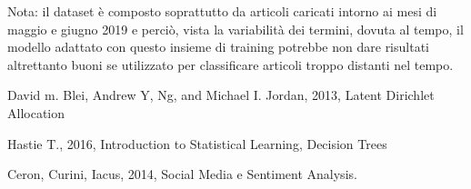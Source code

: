 \documentclass[runningheads]{llncs}
\begin{document}
Nota: il dataset \`e composto soprattutto da articoli caricati intorno ai mesi di maggio e giugno 2019 e perciò, vista la variabilit\`a dei termini, dovuta al tempo, il modello adattato con questo insieme di training potrebbe non dare risultati altrettanto buoni se utilizzato per classificare articoli troppo distanti nel tempo.


\begin{thebibliography}{9}

David m. Blei, Andrew Y, Ng, and Michael I. Jordan, 2013, Latent Dirichlet Allocation

Hastie T., 2016, Introduction to Statistical Learning, Decision Trees

Ceron, Curini, Iacus, 2014,  Social Media e Sentiment Analysis.


\end{thebibliography}
\end{document}
